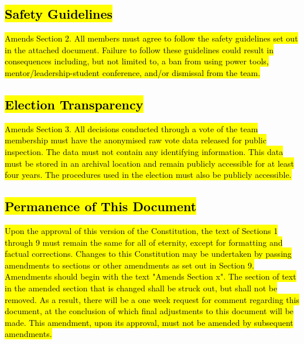 \documentclass[12pt, a4paper]{article}
\begin{document}
\subsection{\hl{Safety Guidelines}}
\hl{Amends Section 2.
All members must agree to follow the safety guidelines set out in the attached document. Failure to follow these guidelines could result in consequences including, but not limited to, a ban from using power tools, mentor/leadership-student conference, and/or dismissal from the team.
}

\subsection{\hl{Election Transparency}}
\hl{Amends Section 3.
All decisions conducted through a vote of the team membership must have the anonymised raw vote data released for public inspection. 
The data must not contain any identifying information. 
This data must be stored in an archival location and remain publicly accessible for at least four years. 
The procedures used in the election must also be publicly accessible. 
}

\subsection{\hl{Permanence of This Document}}
\hl{Upon the approval of this version of the Constitution, the text of Sections 1 through 9 must remain the same for all of eternity, except for formatting and factual corrections. 
Changes to this Constitution may be undertaken by passing amendments to sections or other amendments as set out in Section 9. 
Amendments should begin with the text "Amends Section x". The section of text in the amended section that is changed shall be struck out, but shall not be removed.
As a result, there will be a one week request for comment regarding this document, at the conclusion of which final adjustments to this document will be made.
This amendment, upon its approval, must not be amended by subsequent amendments.}
\end{document}
